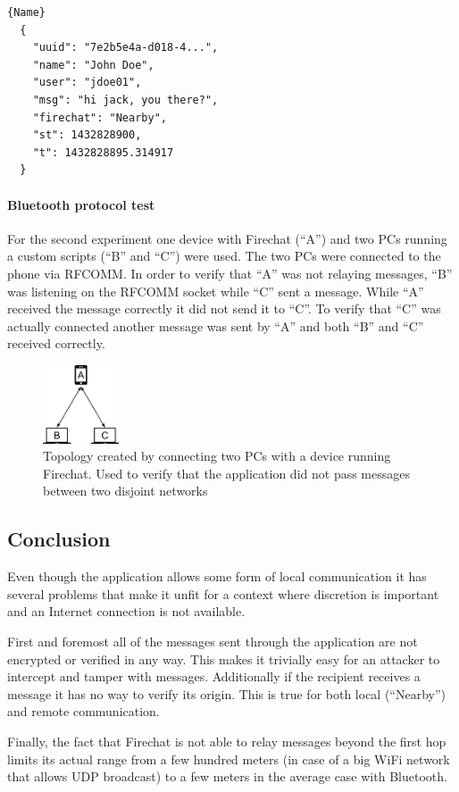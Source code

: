 \begin{minipage}{\textwidth}
  \begin{lstlisting}[caption=Sample Firechat application message,frame=tlrb]{Name}
  {
    "uuid": "7e2b5e4a-d018-4...",
    "name": "John Doe",
    "user": "jdoe01",
    "msg": "hi jack, you there?",
    "firechat": "Nearby",
    "st": 1432828900,
    "t": 1432828895.314917
  }
\end{lstlisting}
\end{minipage}

\paragraph{Bluetooth protocol test}
For the second experiment one device with Firechat (``A'') and two PCs running a custom scripts \cite{custom-script} (``B'' and ``C'') were used. The two PCs were connected to the phone via RFCOMM. In order to verify that ``A'' was not relaying messages, ``B'' was listening on the RFCOMM socket while ``C'' sent a message. While ``A'' received the message correctly it did not send it to ``C''. To verify that ``C'' was actually connected another message was sent by ``A'' and both ``B'' and ``C'' received correctly.

\begin{figure}[ht!]
  \centering
  \includegraphics[width=0.2\textwidth]{img/diagram2.png} 
  \caption{Topology created by connecting two PCs with a device running Firechat. Used to verify that the application did not pass messages between two disjoint networks}
\end{figure}

\subsection{Conclusion}
Even though the application allows some form of local communication it has several problems that make it unfit for a context where discretion is important \cite{iraq-internet-filter} and an Internet connection is not available.

First and foremost all of the messages sent through the application are not encrypted or verified in any way. This makes it trivially easy for an attacker to intercept and tamper with messages.
Additionally if the recipient receives a message it has no way to verify its origin. This is true for both local (``Nearby'') and remote communication.

Finally, the fact that Firechat is not able to relay messages beyond the first hop limits its actual range from a few hundred meters (in case of a big WiFi network that allows UDP broadcast) to a few meters in the average case with Bluetooth.